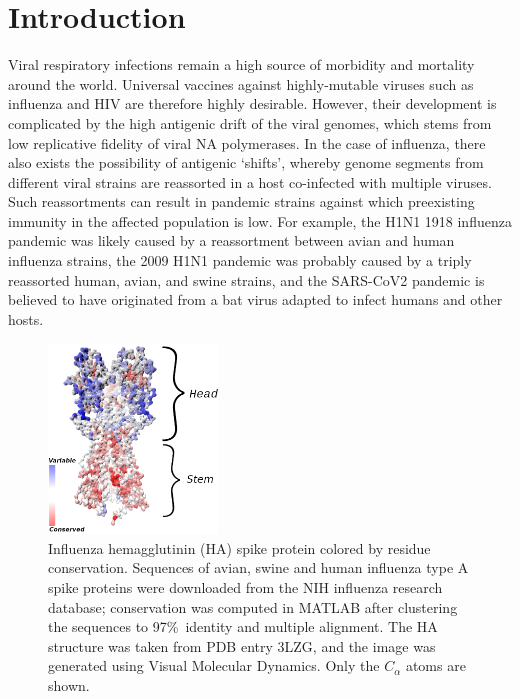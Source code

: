 \documentclass[utf8]{frontiersHLTH}%
\begin{document}
\section{Introduction}
\label{sec:introduction}
Viral respiratory infections remain a high source of morbidity and
mortality around the world. Universal vaccines against highly-mutable
viruses such as influenza and HIV are therefore highly desirable.
However, their development is complicated by the high antigenic drift of
the viral genomes, which stems from low replicative fidelity of viral
NA polymerases.  In the case of influenza, there also exists the possibility of antigenic `shifts',
whereby genome segments from different viral strains are
reassorted in a host co-infected with multiple viruses.
Such reassortments can result in pandemic strains against which preexisting immunity
in the affected population is low.
For example, the H1N1 1918 influenza pandemic was likely caused by a reassortment
between avian and human influenza strains, the 2009 H1N1 pandemic was probably
caused by a triply reassorted human, avian, and swine strains,\cite{taubenberger19} and the
SARS-CoV2 pandemic is believed to have originated from a bat virus adapted
to infect humans and other hosts.\cite{andersen20}

\begin{figure}
\centering
\includegraphics[width=0.4\textwidth]{cons3i.png}
\caption{
Influenza hemagglutinin (HA) spike protein colored by residue conservation. Sequences of avian, swine and human influenza type A 
spike proteins were downloaded from the NIH influenza research database\cite{bao08}; conservation was computed in MATLAB\cite{matlab} after
clustering the sequences to 97\%~identity and multiple alignment. The HA structure was taken from PDB entry 3LZG\cite{xu10}, and the image was generated
using Visual Molecular Dynamics.\cite{Humphrey96} Only the $C_\alpha$ atoms are shown.
}
\label{fig:cons}
\end{figure}
\end{document}
